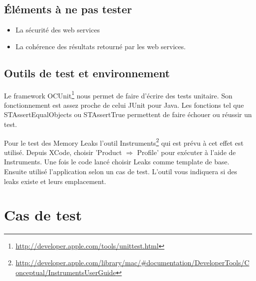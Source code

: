 	\subsection{Éléments à ne pas tester}
		\begin{itemize}
			\item La sécurité des web services
			\item La cohérence des résultats retourné par les web services.
		\end{itemize}
	\subsection{Outils de test et environnement}
		Le framework OCUnit\footnote{\url{http://developer.apple.com/tools/unittest.html}} nous permet de faire d'écrire des tests unitaire. Son fonctionnement est assez proche de celui JUnit pour Java. Les fonctions tel que STAssertEqualObjects ou STAssertTrue permettent de faire échouer ou réussir un test.
		
		Pour le test des Memory Leaks l'outil Instruments\footnote{\url{http://developer.apple.com/library/mac/\#documentation/DeveloperTools/Conceptual/InstrumentsUserGuide}} qui est prévu à cet effet est utilisé. Depuis XCode, choisir 'Product \begin{math}
		\Rightarrow \end{math} Profile' pour exécuter à l'aide de Instruments. Une fois le code lancé choisir Leaks comme template de base. Ensuite utilisé l'application selon un cas de test. L'outil vous indiquera si des leaks existe et leurs emplacement.
		 
\section{Cas de test \label{tc}}
